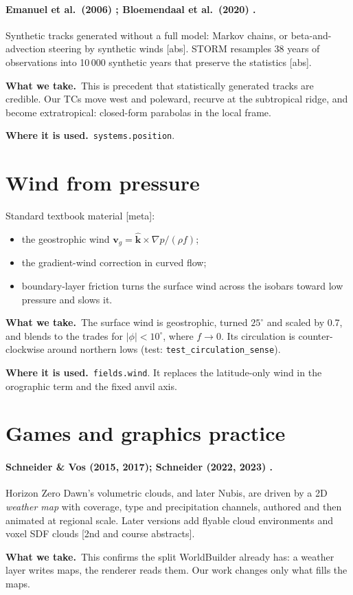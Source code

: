 \documentclass[11pt,a4paper]{article}
\newcommand{\verif}[1]{\textsf{\small[#1]}}
\newcommand{\takes}{\par\noindent\textbf{What we take.}\ }
\newcommand{\used}{\par\noindent\textbf{Where it is used.}\ }
\begin{document}
\paragraph{Emanuel et al.\ (2006) \cite{emanuel2006}; Bloemendaal et al.\ (2020) \cite{bloemendaal2020}.}
Synthetic tracks generated without a full model: Markov chains, or beta-and-advection
steering by synthetic winds \verif{abs}. STORM resamples 38 years of observations into
10\,000 synthetic years that preserve the statistics \verif{abs}.
\takes This is precedent that statistically generated tracks are credible. Our TCs move west
and poleward, recurve at the subtropical ridge, and become extratropical: closed-form
parabolas in the local frame.
\used \texttt{systems.position}.

\section{Wind from pressure}
Standard textbook material \cite{holton2013,vallis2017} \verif{meta}:
\begin{itemize}
\item the geostrophic wind $\mathbf{v}_g = \hat{\mathbf{k}}\times\nabla p/(\rho f)$;
\item the gradient-wind correction in curved flow;
\item boundary-layer friction turns the surface wind across the isobars toward low pressure
  and slows it.
\end{itemize}
\takes The surface wind is geostrophic, turned $25^\circ$ and scaled by 0.7, and blends to
the trades for $|\phi|<10^\circ$, where $f\to0$. Its circulation is counter-clockwise around
northern lows (test: \texttt{test\_circulation\_sense}).
\used \texttt{fields.wind}. It replaces the latitude-only wind in the orographic term and the
fixed anvil axis.

\section{Games and graphics practice}

\paragraph{Schneider \& Vos (2015, 2017); Schneider (2022, 2023) \cite{schneider2015,schneider2017,schneider2022,schneider2023}.}
Horizon Zero Dawn's volumetric clouds, and later Nubis, are driven by a 2D \emph{weather
map} with coverage, type and precipitation channels, authored and then animated at regional
scale. Later versions add flyable cloud environments and voxel SDF clouds
\verif{2nd and course abstracts}.
\takes This confirms the split WorldBuilder already has: a weather layer writes maps, the
renderer reads them. Our work changes only what fills the maps.
\end{document}
